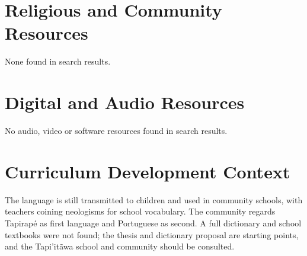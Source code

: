 \documentclass[12pt]{article}
\begin{document}
\section{Religious and Community Resources}
None found in search results.

\section{Digital and Audio Resources}
No audio, video or software resources found in search results.

\section{Curriculum Development Context}
The language is still transmitted to children and used in community schools, with teachers coining neologisms for school vocabulary. The community regards Tapirap\'e as first language and Portuguese as second. A full dictionary and school textbooks were not found; the thesis and dictionary proposal are starting points, and the Tapi'it\~awa school and community should be consulted.
\end{document}
